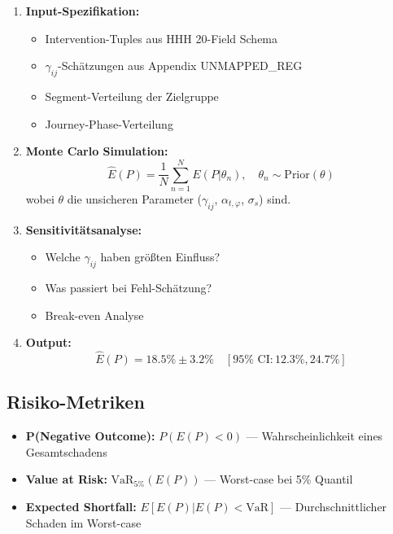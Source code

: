 \begin{enumerate}
\item \textbf{Input-Spezifikation:}
   \begin{itemize}[nosep]
   \item Intervention-Tuples aus HHH 20-Field Schema
   \item $\gamma_{ij}$-Schätzungen aus Appendix UNMAPPED_REG
   \item Segment-Verteilung der Zielgruppe
   \item Journey-Phase-Verteilung
   \end{itemize}

\item \textbf{Monte Carlo Simulation:}
\begin{equation}
\hat{E}(P) = \frac{1}{N} \sum_{n=1}^{N} E(P | \theta_n), \quad \theta_n \sim \text{Prior}(\theta)
\label{eq:20-monte-carlo}
\end{equation}
wobei $\theta$ die unsicheren Parameter ($\gamma_{ij}$, $\alpha_{t,\varphi}$, $\sigma_s$) sind.

\item \textbf{Sensitivitätsanalyse:}
   \begin{itemize}[nosep]
   \item Welche $\gamma_{ij}$ haben größten Einfluss?
   \item Was passiert bei Fehl-Schätzung?
   \item Break-even Analyse
   \end{itemize}

\item \textbf{Output:}
\begin{equation}
\hat{E}(P) = 18.5\% \pm 3.2\% \quad [95\% \text{ CI}: 12.3\%, 24.7\%]
\label{eq:20-simulation-output}
\end{equation}
\end{enumerate}

\subsection{Risiko-Metriken}

\begin{itemize}
\item \textbf{P(Negative Outcome):} $P(E(P) < 0)$ --- Wahrscheinlichkeit eines Gesamtschadens
\item \textbf{Value at Risk:} $\text{VaR}_{5\%}(E(P))$ --- Worst-case bei 5\% Quantil
\item \textbf{Expected Shortfall:} $E[E(P) | E(P) < \text{VaR}]$ --- Durchschnittlicher Schaden im Worst-case
\end{itemize}


